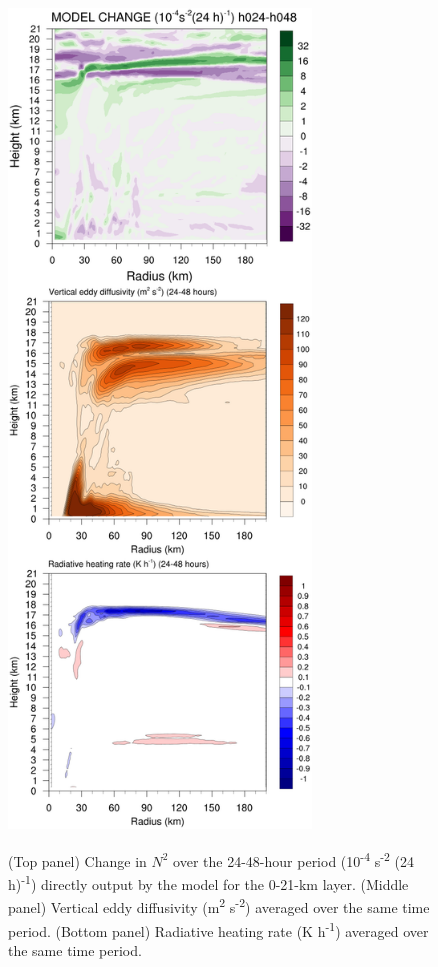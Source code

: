\begin{figure}[ht]
\centerline{\includegraphics[width=19pc]{figures/fulltrop.png}}
\end{figure}
\begin{figure}
\caption{(Top panel) Change in $N^2$ over the 24-48-hour period (10\textsuperscript{-4} s\textsuperscript{-2} (24 h)\textsuperscript{-1}) directly output by the model for the 0-21-km layer. (Middle panel) Vertical eddy diffusivity (m\textsuperscript{2} s\textsuperscript{-2}) averaged over the same time period. (Bottom panel) Radiative heating rate (K h\textsuperscript{-1}) averaged over the same time period.}
\label{fig:fulltrop}
\end{figure}

